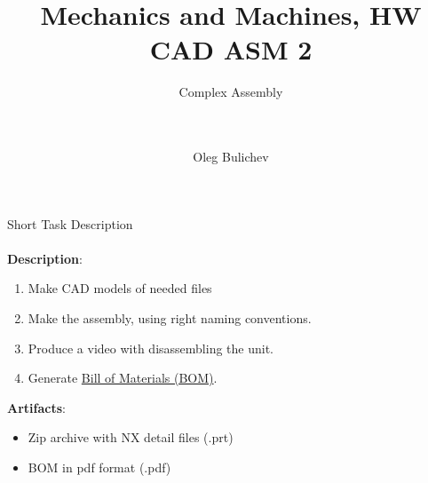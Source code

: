 \documentclass[aspectratio=169]{beamer}
\title[MaM]{Mechanics and Machines, HW CAD ASM 2} %
\subtitle{Complex Assembly
\\ \  \\ \ 
         } %
\author{Oleg Bulichev}
\newcommand{\fbckg}[1]{\usebackgroundtemplate{\texttt{[image: \#1]}}}%
\begin{document}
\setlength{\abovedisplayskip}{0pt}
\setlength{\belowdisplayskip}{0pt}
\setlength{\abovedisplayshortskip}{0pt}
\setlength{\belowdisplayshortskip}{0pt}

\fbckg{fibeamer/figs/title_page.png}

\fbckg{fibeamer/figs/common.png}

\note{\scriptsize \begin{itemize}
        \item \
    \end{itemize}}

\note{
   \ 
}

\begin{frame}[t]{Short Task Description}
    \framesubtitle{}
    \textbf{Description}:
    \begin{enumerate}
        \item Make CAD models of needed files
        \item Make the assembly, using right naming conventions.
        \item Produce a video with disassembling the unit.
        \item Generate \href{https://en.wikipedia.org/wiki/Bill_of_materials}{Bill of Materials (BOM)}.
    \end{enumerate}

    \textbf{Artifacts}: 
    \begin{itemize}
        \item Zip archive with NX detail files (.prt)
        \item BOM in pdf format (.pdf)
    \end{itemize}
\end{frame}
\end{document}
